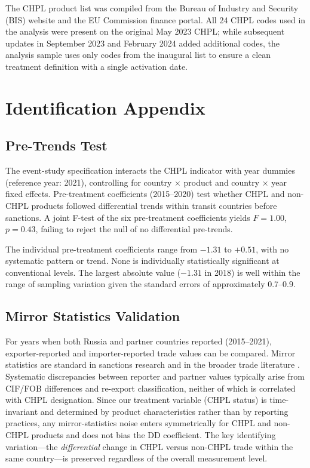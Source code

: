 \documentclass[12pt]{article}
\begin{document}
The CHPL product list was compiled from the Bureau of Industry and Security (BIS) website and the EU Commission finance portal. All 24 CHPL codes used in the analysis were present on the original May 2023 CHPL; while subsequent updates in September 2023 and February 2024 added additional codes, the analysis sample uses only codes from the inaugural list to ensure a clean treatment definition with a single activation date.


\section{Identification Appendix}
\label{app:identification}

\subsection{Pre-Trends Test}

The event-study specification interacts the CHPL indicator with year dummies (reference year: 2021), controlling for country $\times$ product and country $\times$ year fixed effects. Pre-treatment coefficients (2015--2020) test whether CHPL and non-CHPL products followed differential trends within transit countries before sanctions. A joint F-test of the six pre-treatment coefficients yields $F = 1.00$, $p = 0.43$, failing to reject the null of no differential pre-trends.

The individual pre-treatment coefficients range from $-1.31$ to $+0.51$, with no systematic pattern or trend. None is individually statistically significant at conventional levels. The largest absolute value ($-1.31$ in 2018) is well within the range of sampling variation given the standard errors of approximately 0.7--0.9.

\subsection{Mirror Statistics Validation}

For years when both Russia and partner countries reported (2015--2021), exporter-reported and importer-reported trade values can be compared. Mirror statistics are standard in sanctions research \citep{egorov2024sanctions, crozet2020friendly} and in the broader trade literature \citep{head2014gravity}. Systematic discrepancies between reporter and partner values typically arise from CIF/FOB differences and re-export classification, neither of which is correlated with CHPL designation. Since our treatment variable (CHPL status) is time-invariant and determined by product characteristics rather than by reporting practices, any mirror-statistics noise enters symmetrically for CHPL and non-CHPL products and does not bias the DD coefficient. The key identifying variation---the \textit{differential} change in CHPL versus non-CHPL trade within the same country---is preserved regardless of the overall measurement level.
\end{document}
